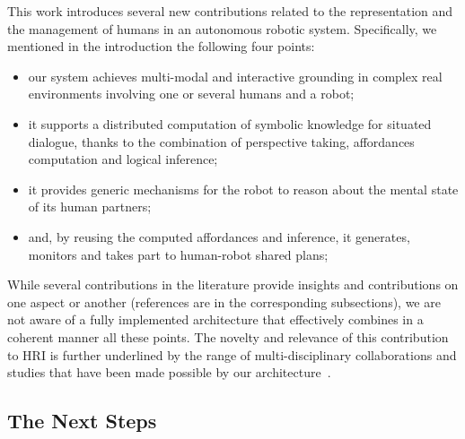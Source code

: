 \documentclass[preprint,3p,times]{elsarticle}
\begin{document}
This work introduces several new contributions related to the
representation and the management of humans in an autonomous robotic system.
Specifically, we mentioned in the introduction the following four points:

\begin{itemize}

	\item our system achieves multi-modal and interactive grounding in complex
		real environments involving one or several humans and a robot;

	\item it supports a distributed computation of symbolic knowledge for
		situated dialogue, thanks to the combination of perspective taking,
		affordances computation and logical inference;

	\item it provides generic mechanisms for the robot to reason about the mental state
		of its human partners;

	\item and, by reusing the computed affordances and inference, it generates,
		monitors and takes part to human-robot shared plans;

\end{itemize}

While several contributions in the literature provide insights and
contributions on one aspect or another (references are in the corresponding
subsections), we are not aware of a fully implemented architecture that
effectively combines in a coherent manner all these points. The novelty and relevance of this contribution to HRI is
further underlined by the range of multi-disciplinary collaborations and studies that
have been made possible by our
architecture~\cite{dautenhahn2006may,koay2007exploratory,Ros2010b,dehais2011physiological,ferreira2015users,GharbiROMAN2015}.


\subsection{The Next Steps}

\end{document}
